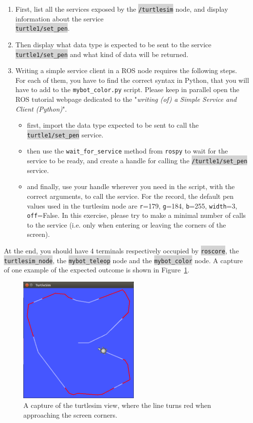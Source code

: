 \documentclass[10pt,a4paper,printanswers]{upmc}
\newcounter{mainmemorder}
\newcommand{\save}{\setcounter{mainmemorder}{\value{enumi}}}
\newcommand{\load}{\setcounter{enumi}{\value{mainmemorder}}}
\newcommand{\mytext}[1]{\colorbox{lightgray}{\texttt{#1}}}
\begin{document}
\begin{enumerate}
  \load
  \item First, list all the services exposed by the \mytext{/turtlesim} node, and display
        information about the service\\ \mytext{turtle1/set\_pen}.
  \item Then display what data type is expected to be sent to the service \mytext{turtle1/set\_pen}
        and what kind of data will be returned.
  \item Writing a simple service client in a ROS node requires the following steps. For each of
        them, you have to find the correct syntax in Python, that you will have to add to the
        \texttt{mybot\_color.py} script. Please keep in parallel open the ROS tutorial webpage
        dedicated to the "\textit{writing (of) a Simple Service and Client (Python)}".
        \begin{itemize}
          \item first, import the data type expected to be sent to call the
                \mytext{turtle1/set\_pen} service.
          \item then use the \texttt{wait\_for\_service} method from \texttt{rospy} to wait for the
                service to be ready, and create a handle for calling the \mytext{/turtle1/set\_pen}
                service.
          \item and finally, use your handle wherever you need in the script, with the correct
                arguments, to call the service. For the record, the default pen values used in the
                turtlesim node are \texttt{r}=179, \texttt{g}=184, \texttt{b}=255, \texttt{width}=3,
                \texttt{off}=False. In this exercise, please try to make a minimal number of calls
                to the service (i.e. only when entering or leaving the corners of the screen).
        \end{itemize}
        \save
\end{enumerate}
At the end, you should have 4 terminals respectively occupied by \mytext{roscore}, the
\mytext{turtlesim\_node}, the \mytext{mybot\_teleop} node and the \mytext{mybot\_color} node. A
capture of one example of the expected outcome is shown in Figure~\ref{fig:turtlesim}.
\begin{figure}
  \centering \includegraphics[width=6cm]{figures/turtlesim.png}
  \caption{A capture of the turtlesim view, where the line turns red when approaching the screen
    corners.}
  \label{fig:turtlesim}
\end{figure}
\end{document}
